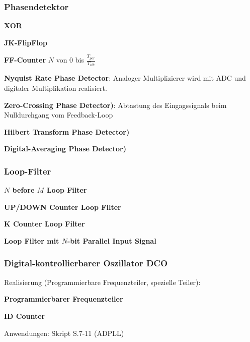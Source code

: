\begin{multicols}{2}
    \subsubsection{Phasendetektor}
    \begin{compactitem}
        \item \textbf{XOR}  
         \item \textbf{JK-FlipFlop} 
         \item \textbf{FF-Counter} $N$ von $0$ bis $\frac{T_{per}}{T_{clk}}$
         \item \textbf{Nyquist Rate Phase Detector}: Analoger Multiplizierer wird mit ADC und digitaler Multiplikation realisiert.
         \item \textbf{Zero-Crossing Phase Detector)}: Abtastung des Eingagssignals beim Nulldurchgang vom Feedback-Loop
         \item \textbf{Hilbert Transform Phase Detector)}
         \item \textbf{Digital-Averaging Phase Detector)}
    \end{compactitem}
    
    \subsubsection{Loop-Filter}
    \begin{compactitem}
         \item \textbf{\boldmath$N$ before \boldmath$M$ Loop Filter}  
         \item \textbf{UP/DOWN Counter Loop Filter} 
         \item \textbf{K Counter Loop Filter} 
         \item \textbf{Loop Filter mit \boldmath$N$-bit Parallel Input Signal}
    \end{compactitem}
    
    \subsubsection{Digital-kontrollierbarer Oszillator DCO}
    Realisierung (Programmierbare Frequenzteiler, spezielle Teiler):
    \begin{compactitem}
         \item \textbf{Programmierbarer Frequenzteiler}  
         \item \textbf{ID Counter} 
    \end{compactitem}
    Anwendungen: Skript S.7-11 (ADPLL)
\end{multicols}
